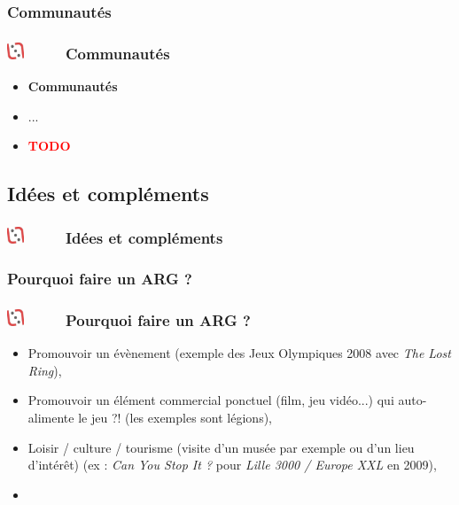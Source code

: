 \documentclass[slidetop,11pt]{beamer}
\def\sectionPartIIbV{Communaut{\'e}s}
\def\sectionPartIIc{Id{\'e}es et compl{\'e}ments}
\def\sectionPartIIcI{Pourquoi faire un ARG ?}
\def\moreInFrameTitleLeftt{\includegraphics[height=0.5cm]{img/ligueludique-0.png}~~~~~}
\begin{document}
\subsubsection{\sectionPartIIbV} %
\begin{frame}
	\frametitle{\moreInFrameTitleLeftt \sectionPartIIbV }
	\begin{itemize}
		\item \textbf{ \sectionPartIIbV }
		\item[] ...
		\item \textcolor{red}{ \textbf{TODO} }
	\end{itemize}
\end{frame} 

\subsection{\sectionPartIIc} %
\begin{frame}
	\frametitle{\moreInFrameTitleLeftt \sectionPartIIc }
	\tableofcontents[sections=2,currentsection,subsectionstyle=show/shaded/hide]
\end{frame} 

\subsubsection{\sectionPartIIcI} %
\begin{frame}
	\frametitle{\moreInFrameTitleLeftt \sectionPartIIcI }
	\begin{itemize}
		\item Promouvoir un {\'e}v{\`e}nement (exemple des Jeux Olympiques 2008 avec \emph{The Lost Ring}), 
		\item Promouvoir un {\'e}l{\'e}ment commercial ponctuel (film, jeu vid{\'e}o...) qui auto-alimente le jeu ?! (les exemples sont l{\'e}gions), 
		\item Loisir / culture / tourisme (visite d'un mus{\'e}e par exemple ou d'un lieu d'int{\'e}r{\^e}t) (ex : \emph{Can You Stop It ?} pour \emph{Lille 3000 / Europe XXL} en 2009), 
		\item 
	\end{itemize}
\end{frame} 
\end{document}
